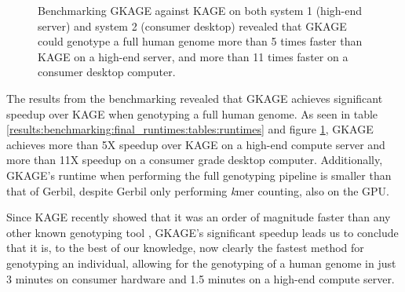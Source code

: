 \begin{figure}[H]
\centering
\caption{
  Benchmarking GKAGE against KAGE on both system 1 (high-end server) and system 2 (consumer desktop) revealed that GKAGE could genotype a full human genome more than 5 times faster than KAGE on a high-end server, and more than 11 times faster on a consumer desktop computer.
}
\label{results:benchmarking:final_runtimes:figures:runtimes}
\end{figure}
%

The results from the benchmarking revealed that GKAGE achieves significant speedup over KAGE when genotyping a full human genome.
As seen in table \ref{results:benchmarking:final_runtimes:tables:runtimes} and figure \ref{results:benchmarking:final_runtimes:figures:runtimes}, GKAGE achieves more than 5X speedup over KAGE on a high-end compute server and more than 11X speedup on a consumer grade desktop computer.
Additionally, GKAGE's runtime when performing the full genotyping pipeline is smaller than that of Gerbil, despite Gerbil only performing \textit{k}mer counting, also on the GPU.

Since KAGE recently showed that it was an order of magnitude faster than any other known genotyping tool \cite{kage}, GKAGE's significant speedup leads us to conclude that it is, to the best of our knowledge, now clearly the fastest method for genotyping an individual, allowing for the genotyping of a human genome in just 3 minutes on consumer hardware and 1.5 minutes on a high-end compute server.
